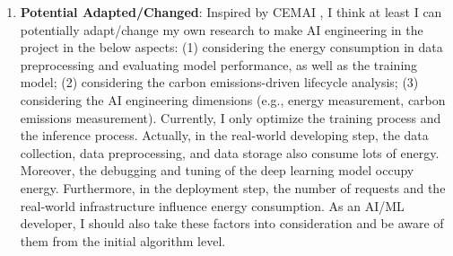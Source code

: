 \documentclass[11pt]{article}
\begin{document}
\begin{enumerate}
  
  \item  \textbf{Potential Adapted/Changed}: Inspired by CEMAI \cite{husom2024engineering}, I think at least I can potentially adapt/change my own research to make AI engineering in the project \cite{huang2023epilepsynet,huang2023lightweight,aminifar2024lightweight} in the below aspects: (1) considering the energy consumption in data preprocessing and evaluating model performance, as well as the training model; (2) considering the carbon emissions-driven lifecycle analysis; (3) considering the AI engineering dimensions (e.g., energy measurement, carbon emissions measurement). Currently, I only optimize the training process and the inference process. Actually, in the real-world developing step, the data collection, data preprocessing, and data storage also consume lots of energy. Moreover, the debugging and tuning of the deep learning model occupy energy. Furthermore, in the deployment step, the number of requests and the real-world infrastructure influence energy consumption. As an AI/ML developer, I should also take these factors into consideration and be aware of them from the initial algorithm level.
  
\end{enumerate}




\end{document}

